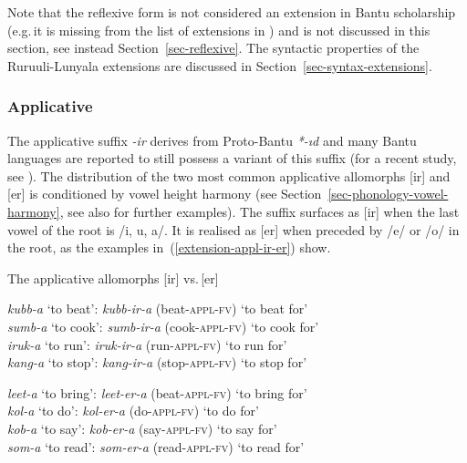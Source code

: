 Note that the reflexive form is not considered an extension in Bantu scholarship (e.g.\,it is missing from the list of extensions in \citealt[173]{Schadebergetal2019Bantu}) and is not discussed in this section, see instead Section~\ref{sec-reflexive}. 
The syntactic properties of the Ru\-ruu\-li\hyp{}Lu\-nya\-la extensions are discussed in Section~\ref{sec-syntax-extensions}. 


\subsubsection{Applicative}\label{sec-extension-applicative}

The applicative suffix \textit{-ir} derives from Pro\-to-Bantu \textit{*-ıd} \citep[173]{Schadebergetal2019Bantu} and many Bantu languages are reported to still possess a variant of this suffix (for a recent study, see \citealt{Pacchiarotti2017Bantu}). 
The distribution of the two most common applicative allomorphs [ir] and [er] is conditioned by vowel height harmony (see Section~\ref{sec-phonology-vowel-harmony}, see also \citealt{Atuhairwe2019Applicative} for further examples).  
The suffix surfaces as [ir] when the last vowel of the root is  /i, u, a/. 
It is realised as [er] when preceded by /e/ or /o/ in the root, as the examples in~(\ref{extension-appl-ir-er}) show.

\ea \label{extension-appl-ir-er}
The applicative allomorphs [ir] vs.\,[er]
\begin{xlist}
\ex
\textit{kubb-a}	`to beat':	\textit{kubb-ir-a} (beat-\textsc{appl}-\textsc{fv}) `to beat for’\\
\textit{sumb-a}	`to cook':	\textit{sumb-ir-a} (cook-\textsc{appl}-\textsc{fv}) `to cook for’\\
\textit{iruk-a}	 `to run':	 \textit{iruk-ir-a} (run-\textsc{appl}-\textsc{fv}) `to run for’\\
\textit{kang-a}	 `to stop':	 \textit{kang-ir-a} (stop-\textsc{appl}-\textsc{fv}) `to stop for’

\ex
\textit{leet-a}	`to bring':	\textit{leet-er-a} (beat-\textsc{appl}-\textsc{fv}) `to bring for’\\
\textit{kol-a} 	`to do': \textit{kol-er-a} (do-\textsc{appl}-\textsc{fv}) `to do for’\\
\textit{kob-a} 	`to say':  \textit{kob-er-a} (say-\textsc{appl}-\textsc{fv}) `to say for’\\
\textit{som-a} 	`to read': \textit{som-er-a} (read-\textsc{appl}-\textsc{fv}) `to read for’
\end{xlist}
\z

